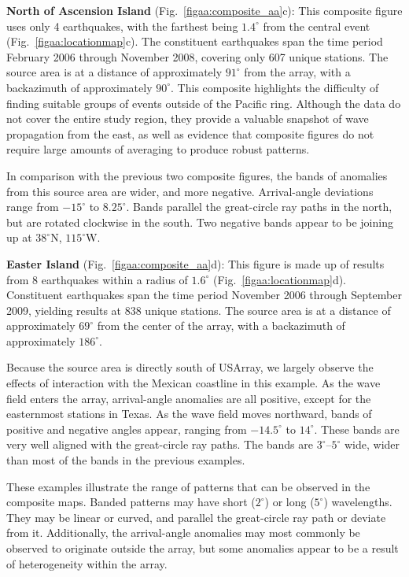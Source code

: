 \documentclass[12pt,oneside]{book}
\newcommand{\degree}[1]{\mbox{$#1^{\circ}$}}
\begin{document}
\textbf{North of Ascension Island} (Fig.~\ref{figaa:composite_aa}c): This composite figure uses only 4 earthquakes, with the farthest being \degree{1.4} from the central event (Fig.~\ref{figaa:locationmap}c). The constituent earthquakes span the time period February 2006 through November 2008, covering only 607 unique stations. The source area is at a distance of approximately \degree{91} from the array, with a backazimuth of approximately \degree{90}. This composite highlights the difficulty of finding suitable groups of events outside of the Pacific ring. Although the data do not cover the entire study region, they provide a valuable snapshot of wave propagation from the east, as well as evidence that composite figures do not require large amounts of averaging to produce robust patterns.  

In comparison with the previous two composite figures, the bands of anomalies from this source area are wider, and more negative. Arrival-angle deviations range from \degree{-15} to \degree{8.25}. Bands parallel the great-circle ray paths in the north, but are rotated clockwise in the south. Two negative bands appear to be joining up at \degree{38}N, \degree{115}W. 

\textbf{Easter Island} (Fig.~\ref{figaa:composite_aa}d): This figure is made up of results from 8 earthquakes within a radius of \degree{1.6} (Fig.~\ref{figaa:locationmap}d). Constituent earthquakes span the time period November 2006 through September 2009, yielding results at 838 unique stations. The source area is at a distance of approximately \degree{69} from the center of the array, with a backazimuth of approximately \degree{186}. 

Because the source area is directly south of USArray, we largely observe the effects of interaction with the Mexican coastline in this example. As the wave field enters the array, arrival-angle anomalies are all positive, except for the easternmost stations in Texas. As the wave field moves northward, bands of positive and negative angles appear, ranging from \degree{-14.5} to \degree{14}. These bands are very well aligned with the great-circle ray paths. The bands are \degree{3}--\degree{5} wide, wider than most of the bands in the previous examples. 

These examples illustrate the range of patterns that can be observed in the composite maps. Banded patterns may have short (\degree{2}) or long (\degree{5}) wavelengths. They may be linear or curved, and parallel the great-circle ray path or deviate from it. Additionally, the arrival-angle anomalies may most commonly be observed to originate outside the array, but some anomalies appear to be a result of heterogeneity within the array. 
\end{document}
